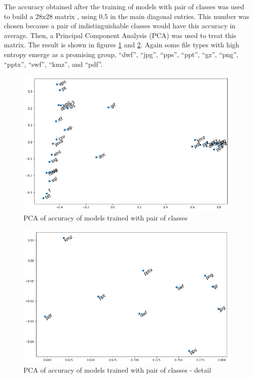 The accuracy obtained after the training of models with pair of classes was used to build a 28x28 matrix , using 0.5 in the main diagonal entries. This number was chosen because a pair of indistinguishable classes would have this accuracy in average. Then, a Principal Component Analysis (PCA)  was used to treat this matrix. The result is shown in figures \ref{fig:pca} and \ref{fig:pca2}. Again some file types with high entropy emerge as a promising group, ``dwf'',
``jpg'',
``pps'',
``ppt'',
``gz'',
``png'',
``pptx'',
``swf'',
``kmz'',
and ``pdf''.

\noindent
\begin{figure}[htb!]
\centering\includegraphics[width=1.0\textwidth]{content/pca.png}
\caption{\label{fig:pca}PCA of accuracy of models trained with pair of classes}%
\end{figure}


\noindent
\begin{figure}[htb!]
\centering\includegraphics[width=1.0\textwidth]{content/pca2.png}
\caption{\label{fig:pca2}PCA of accuracy of models trained with pair of classes - detail}%
\end{figure}


